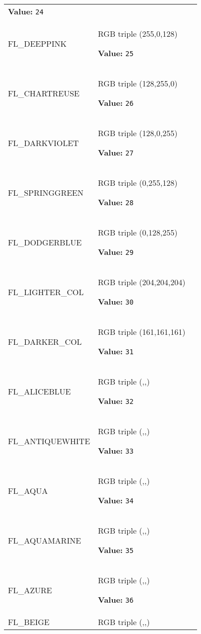\begin{longtable}{|p{\varnamewidth}|p{\vardescrwidth}|l}
\textbf{Value:} 
{\tt 24}&\\
\cline{1-2}
\raggedright F\-L\-\_\-D\-E\-E\-P\-P\-I\-N\-K\- & \raggedright RGB triple (255,0,128)

\textbf{Value:} 
{\tt 25}&\\
\cline{1-2}
\raggedright F\-L\-\_\-C\-H\-A\-R\-T\-R\-E\-U\-S\-E\- & \raggedright RGB triple (128,255,0)

\textbf{Value:} 
{\tt 26}&\\
\cline{1-2}
\raggedright F\-L\-\_\-D\-A\-R\-K\-V\-I\-O\-L\-E\-T\- & \raggedright RGB triple (128,0,255)

\textbf{Value:} 
{\tt 27}&\\
\cline{1-2}
\raggedright F\-L\-\_\-S\-P\-R\-I\-N\-G\-G\-R\-E\-E\-N\- & \raggedright RGB triple (0,255,128)

\textbf{Value:} 
{\tt 28}&\\
\cline{1-2}
\raggedright F\-L\-\_\-D\-O\-D\-G\-E\-R\-B\-L\-U\-E\- & \raggedright RGB triple (0,128,255)

\textbf{Value:} 
{\tt 29}&\\
\cline{1-2}
\raggedright F\-L\-\_\-L\-I\-G\-H\-T\-E\-R\-\_\-C\-O\-L\-1\- & \raggedright RGB triple (204,204,204)

\textbf{Value:} 
{\tt 30}&\\
\cline{1-2}
\raggedright F\-L\-\_\-D\-A\-R\-K\-E\-R\-\_\-C\-O\-L\-1\- & \raggedright RGB triple (161,161,161)

\textbf{Value:} 
{\tt 31}&\\
\cline{1-2}
\raggedright F\-L\-\_\-A\-L\-I\-C\-E\-B\-L\-U\-E\- & \raggedright RGB triple (,,)

\textbf{Value:} 
{\tt 32}&\\
\cline{1-2}
\raggedright F\-L\-\_\-A\-N\-T\-I\-Q\-U\-E\-W\-H\-I\-T\-E\- & \raggedright RGB triple (,,)

\textbf{Value:} 
{\tt 33}&\\
\cline{1-2}
\raggedright F\-L\-\_\-A\-Q\-U\-A\- & \raggedright RGB triple (,,)

\textbf{Value:} 
{\tt 34}&\\
\cline{1-2}
\raggedright F\-L\-\_\-A\-Q\-U\-A\-M\-A\-R\-I\-N\-E\- & \raggedright RGB triple (,,)

\textbf{Value:} 
{\tt 35}&\\
\cline{1-2}
\raggedright F\-L\-\_\-A\-Z\-U\-R\-E\- & \raggedright RGB triple (,,)

\textbf{Value:} 
{\tt 36}&\\
\cline{1-2}
\raggedright F\-L\-\_\-B\-E\-I\-G\-E\- & \raggedright RGB triple (,,)


\end{longtable}

